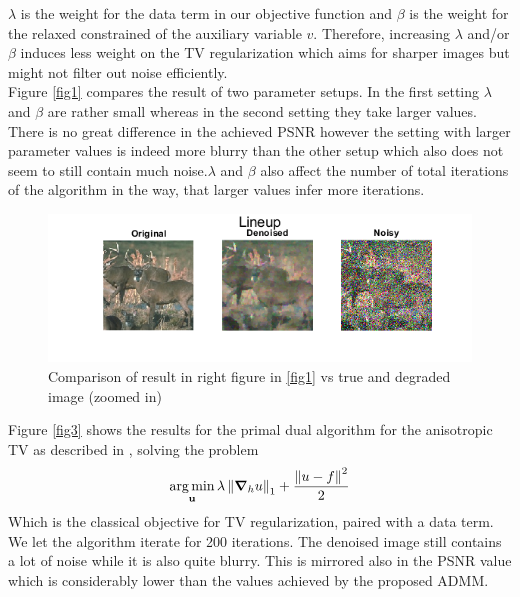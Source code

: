 \vspace{1cm}
$\lambda$ is the weight for the data term in our objective function and $\beta$ is the weight for the relaxed constrained of the auxiliary variable $v$. Therefore, increasing $\lambda$ and/or $\beta$ induces less weight on the TV regularization which aims for sharper images but might not filter out noise efficiently.\\
Figure \ref{fig1} compares the result of two parameter setups. In the first setting $\lambda$ and $\beta$ are rather small whereas in the second setting they take larger values. There is no great difference in the achieved PSNR however the setting with larger parameter values is indeed more blurry than the other setup which also does not seem to still contain much noise.$\lambda$ and $\beta$ also affect the number of total iterations of the algorithm in the way, that larger values infer more iterations.

\begin{figure}[H]
    \centering
    \includegraphics[scale=1]{images/test1.png}
    \caption{Comparison of result in right figure in \ref{fig1} vs true and degraded image (zoomed in)}
    \label{fig2}
\end{figure}
\vspace{2cm}
Figure \ref{fig3} shows the results for the primal dual algorithm for the anisotropic TV as described in \cite{MR2722312}, solving the problem
\begin{align}
   \argmin_{\vec{u}} \lambda \norm{\grad{u}{h}}_1 + \frac{\norm{u-f}^2}{2}
\end{align}
Which is the classical objective for TV regularization, paired with a data term. We let the algorithm iterate for 200 iterations. The denoised image still contains a lot of noise while it is also quite blurry. This is mirrored also in the PSNR value which is considerably lower than the values achieved by the proposed ADMM.

